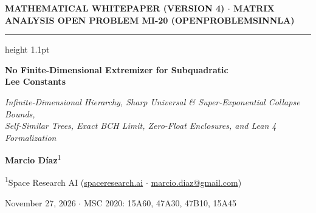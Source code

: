 \documentclass[10pt,letterpaper]{article}
\begin{document}
\thispagestyle{firstpage}

{\sffamily\footnotesize\bfseries\color{accentblue}MATHEMATICAL WHITEPAPER (VERSION 4) $\cdot$ MATRIX ANALYSIS \hfill OPEN PROBLEM MI-20 (OPENPROBLEMSINNLA)}\par
\vspace{2pt}
{\color{ink}\hrule height 1.1pt}
\vspace{11pt}

\begin{center}
  {\LARGE\bfseries\color{ink} No Finite-Dimensional Extremizer for Subquadratic\\[3pt] Lee Constants}\par
  \vspace{6pt}
  {\large\itshape\color{muted} Infinite-Dimensional Hierarchy, Sharp Universal \& Super-Exponential Collapse Bounds,\\[1pt] Self-Similar Trees, Exact BCH Limit, Zero-Float Enclosures, and Lean 4 Formalization}\par
  \vspace{8pt}
  {\normalsize\bfseries Marcio Díaz}\textsuperscript{1}\par
  \vspace{1.5pt}
  {\small\color{muted}\textsuperscript{1}Space Research AI (\href{https://spaceresearch.ai}{spaceresearch.ai} $\cdot$ \href{mailto:marcio.diaz@gmail.com}{marcio.diaz@gmail.com})}\par
  {\footnotesize\color{muted}November 27, 2026 \quad $\cdot$ \quad MSC 2020: 15A60, 47A30, 47B10, 15A45}
\end{center}
\vspace{3pt}
\end{document}
